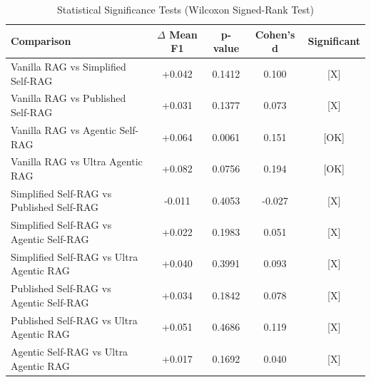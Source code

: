 
\begin{table}[h]
\centering
\caption{Statistical Significance Tests (Wilcoxon Signed-Rank Test)}
\label{tab:statistical}
\begin{tabular}{lcccc}
\toprule
Comparison & $\Delta$ Mean F1 & p-value & Cohen's d & Significant \\
\midrule
Vanilla RAG vs Simplified Self-RAG & +0.042 & 0.1412 & 0.100 & [X] \\
Vanilla RAG vs Published Self-RAG & +0.031 & 0.1377 & 0.073 & [X] \\
Vanilla RAG vs Agentic Self-RAG & +0.064 & 0.0061 & 0.151 & [OK] \\
Vanilla RAG vs Ultra Agentic RAG & +0.082 & 0.0756 & 0.194 & [OK] \\
Simplified Self-RAG vs Published Self-RAG & -0.011 & 0.4053 & -0.027 & [X] \\
Simplified Self-RAG vs Agentic Self-RAG & +0.022 & 0.1983 & 0.051 & [X] \\
Simplified Self-RAG vs Ultra Agentic RAG & +0.040 & 0.3991 & 0.093 & [X] \\
Published Self-RAG vs Agentic Self-RAG & +0.034 & 0.1842 & 0.078 & [X] \\
Published Self-RAG vs Ultra Agentic RAG & +0.051 & 0.4686 & 0.119 & [X] \\
Agentic Self-RAG vs Ultra Agentic RAG & +0.017 & 0.1692 & 0.040 & [X] \\
\bottomrule
\end{tabular}
\end{table}
